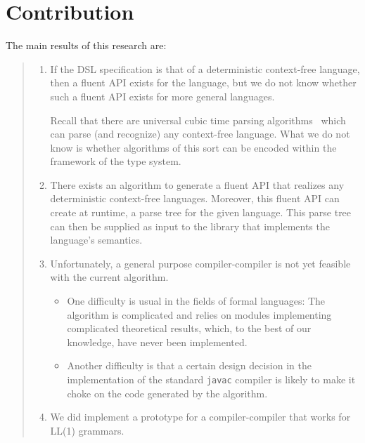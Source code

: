 \section{Contribution}
\label{section:contribution}
The main results of this research are:
\begin{quote}
  \begin{enumerate}
  \item If the DSL specification is that of a deterministic context-free
    language, then a fluent API exists for the language, but we do not know
    whether such a fluent API exists for more general languages.
  \par
  Recall that there are universal cubic time parsing
  algorithms~\cite{Cocke:1969,Earley:1970,Younger:1967} which can parse (and recognize) any
  context-free language. What we do not know is whether algorithms of this sort
  can be encoded within the framework of the \Java type system.
  \item
  There exists an algorithm to generate a fluent API that realizes any
  deterministic context-free languages. Moreover, this fluent API can create
  at runtime, a parse tree for the given language. This parse tree can then be
  supplied as input to the library that implements the language's semantics.
    \item
  Unfortunately, a general purpose compiler-compiler
  is not yet feasible with the current algorithm.
  \begin{itemize}
    \item One difficulty is usual in the fields of formal languages:
      The algorithm is complicated and relies on
      modules implementing complicated theoretical results, which, to the best of our
      knowledge, have never been implemented.
    \item Another difficulty is that a certain design decision in the
      implementation of the standard \texttt{javac} compiler is likely to make it choke on the
      \Java code generated by the algorithm.
  \end{itemize}
  \item
    We did implement a prototype for a compiler-compiler that works for LL(1) grammars.
  \end{enumerate}
\end{quote}

